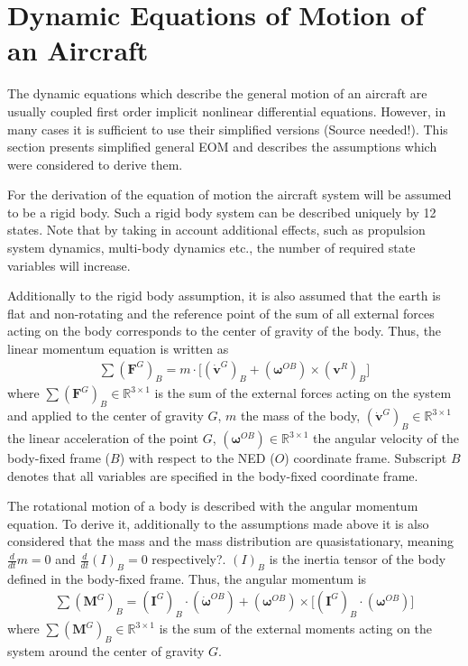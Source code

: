 \documentclass[11pt, a4paper, twoside]{report}
\begin{document}
\thispagestyle{fancy}

\section{Dynamic Equations of Motion of an Aircraft} \label{sec:eqs_motion}

The dynamic equations which describe the general motion of an aircraft are usually coupled first order implicit nonlinear differential equations. However, in many cases it is sufficient to use their simplified versions (Source needed!). This section presents simplified general \acrshort{EOM} and describes the assumptions which were considered to derive them.

For the derivation of the equation of motion the aircraft system will be assumed to be a rigid body. Such a rigid body system can be described uniquely by 12 states. Note that by taking in account additional effects, such as propulsion system dynamics, multi-body dynamics etc., the number of required state variables will increase. 

Additionally to the rigid body assumption, it is also assumed that the earth is flat and non-rotating and the reference point of the sum of all external forces acting on the body corresponds to the center of gravity of the body. Thus, the linear momentum equation is written as
\begin{equation}
	\begin{split}
		\sum (\bm{F}^G)_B = m \cdot \Big[ (\bm{\dot{v}}^G)_{B} + (\bm{\omega}^{OB})\times(\bm{v}^R)_{B} \Big]
		\label{eq:lin_momentum}
	\end{split}
\end{equation}
where $\sum(\bm{F}^G)_B \in \mathbb{R}^{3 \times 1}$ is the sum of the external forces acting on the system and applied to the center of gravity $G$, $m$ the mass of the body, $(\bm{\dot{v}}^G)_{B} \in \mathbb{R}^{3 \times 1}$ the linear acceleration of the point $G$, $(\bm{\omega}^{OB}) \in \mathbb{R}^{3 \times 1}$ the angular velocity of the body-fixed frame ($B$) with respect to the \acrfull{NED} ($O$) coordinate frame. Subscript $B$ denotes that all variables are specified in the body-fixed coordinate frame.

The rotational motion of a body is described with the angular momentum equation. To derive it, additionally to the assumptions made above it is also considered that the mass and the mass distribution are quasistationary, meaning $\frac{d}{dt}m=0$ and $\frac{d}{dt}(I)_B=0$ respectively?. $(I)_B$ is the inertia tensor of the body defined in the body-fixed frame. Thus, the angular momentum is
\begin{equation}
	\begin{split}
		\sum (\bm{M}^G)_B = (\bm{I}^G)_B \cdot (\bm{\dot{\omega}}^{OB}) + (\bm{\omega}^{OB}) \times \Big[(\bm{I}^G)_B \cdot (\bm{\omega}^{OB})\Big]
		\label{eq:ang_momentum}
	\end{split}
\end{equation}
where $\sum (\bm{M}^G)_B \in \mathbb{R}^{3 \times 1}$ is the sum of the external moments acting on the system around the center of gravity $G$.
\end{document}
